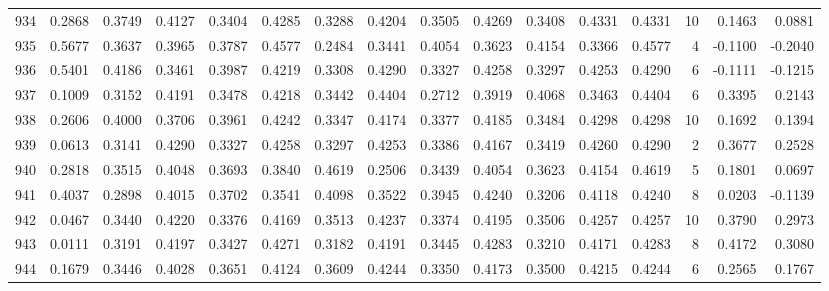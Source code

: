 \begin{tabular}{lrrrrrrrrrrrrrrr}
934 &      0.2868 &  0.3749 &  0.4127 &  0.3404 &  0.4285 &  0.3288 &  0.4204 &  0.3505 &  0.4269 &  0.3408 &   0.4331 &     0.4331 &     10 &                    0.1463 &                     0.0881 \\
935 &      0.5677 &  0.3637 &  0.3965 &  0.3787 &  0.4577 &  0.2484 &  0.3441 &  0.4054 &  0.3623 &  0.4154 &   0.3366 &     0.4577 &      4 &                   -0.1100 &                    -0.2040 \\
936 &      0.5401 &  0.4186 &  0.3461 &  0.3987 &  0.4219 &  0.3308 &  0.4290 &  0.3327 &  0.4258 &  0.3297 &   0.4253 &     0.4290 &      6 &                   -0.1111 &                    -0.1215 \\
937 &      0.1009 &  0.3152 &  0.4191 &  0.3478 &  0.4218 &  0.3442 &  0.4404 &  0.2712 &  0.3919 &  0.4068 &   0.3463 &     0.4404 &      6 &                    0.3395 &                     0.2143 \\
938 &      0.2606 &  0.4000 &  0.3706 &  0.3961 &  0.4242 &  0.3347 &  0.4174 &  0.3377 &  0.4185 &  0.3484 &   0.4298 &     0.4298 &     10 &                    0.1692 &                     0.1394 \\
939 &      0.0613 &  0.3141 &  0.4290 &  0.3327 &  0.4258 &  0.3297 &  0.4253 &  0.3386 &  0.4167 &  0.3419 &   0.4260 &     0.4290 &      2 &                    0.3677 &                     0.2528 \\
940 &      0.2818 &  0.3515 &  0.4048 &  0.3693 &  0.3840 &  0.4619 &  0.2506 &  0.3439 &  0.4054 &  0.3623 &   0.4154 &     0.4619 &      5 &                    0.1801 &                     0.0697 \\
941 &      0.4037 &  0.2898 &  0.4015 &  0.3702 &  0.3541 &  0.4098 &  0.3522 &  0.3945 &  0.4240 &  0.3206 &   0.4118 &     0.4240 &      8 &                    0.0203 &                    -0.1139 \\
942 &      0.0467 &  0.3440 &  0.4220 &  0.3376 &  0.4169 &  0.3513 &  0.4237 &  0.3374 &  0.4195 &  0.3506 &   0.4257 &     0.4257 &     10 &                    0.3790 &                     0.2973 \\
943 &      0.0111 &  0.3191 &  0.4197 &  0.3427 &  0.4271 &  0.3182 &  0.4191 &  0.3445 &  0.4283 &  0.3210 &   0.4171 &     0.4283 &      8 &                    0.4172 &                     0.3080 \\
944 &      0.1679 &  0.3446 &  0.4028 &  0.3651 &  0.4124 &  0.3609 &  0.4244 &  0.3350 &  0.4173 &  0.3500 &   0.4215 &     0.4244 &      6 &                    0.2565 &                     0.1767 \\

\end{tabular}
